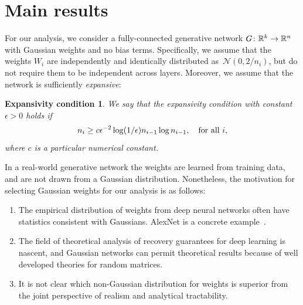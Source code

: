 
\section{Main results}

For our analysis, we consider a fully-connected generative network $G\colon \mathbb{R}^k \to \mathbb{R}^n$ with Gaussian weights and no bias terms. Specifically, we assume that the weights $W_i$ are independently and identically distributed as~$\mathcal N(0,2/n_i)$, but do not require them to be independent across layers.
Moreover, we assume that the network is sufficiently \textit{expansive}:

\newtheorem*{block}{Expansivity condition}
\begin{block} 
We say that the expansivity condition with constant $\epsilon>0$ holds if
\[
n_i \geq c \epsilon^{-2} \log(1/\epsilon) n_{i-1} \log n_{i-1},
\quad
\text{for all }
i,
\]
where $c$ is a particular numerical constant.
\end{block}
%
\noindent
In a real-world generative network the weights are learned from training data, and are not drawn from a Gaussian distribution. Nonetheless, the motivation for selecting Gaussian weights for our analysis is as follows:
\begin{enumerate}
\item The empirical distribution of weights from deep neural networks often have statistics consistent with Gaussians.  AlexNet is a concrete example~\citep{Arora15}.
\item The field of theoretical analysis of recovery guarantees for deep learning is nascent, and Gaussian networks can permit theoretical results because of well developed theories for random matrices.
\item It is not clear which non-Gaussian distribution for weights is superior from the joint perspective of realism and analytical tractability.
\end{enumerate}

